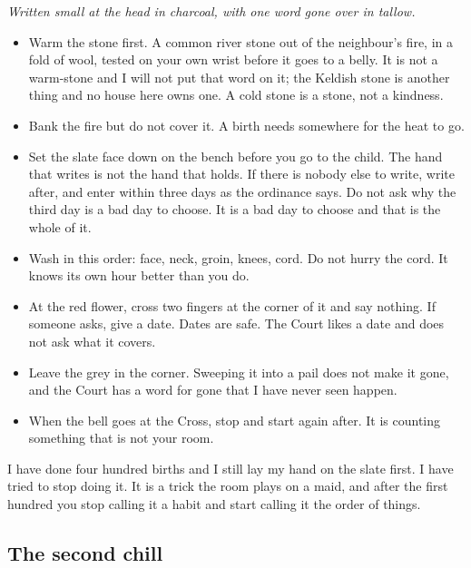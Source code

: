 \documentclass{design/chronicle}
\begin{document}
\emph{Written small at the head in charcoal, with one word gone over in tallow.}

\begin{itemize}[leftmargin=1.4em,itemsep=1pt,topsep=3pt,parsep=0pt]

\item Warm the stone first. A common river stone out of the neighbour’s fire, in a fold of wool, tested on your own wrist before it goes to a belly. It is not a warm-stone and I will not put that word on it; the Keldish stone is another thing and no house here owns one. A cold stone is a stone, not a kindness.

\item Bank the fire but do not cover it. A birth needs somewhere for the heat to go.

\item Set the slate face down on the bench before you go to the child. The hand that writes is not the hand that holds. If there is nobody else to write, write after, and enter within three days as the ordinance says. Do not ask why the third day is a bad day to choose. It is a bad day to choose and that is the whole of it.

\item Wash in this order: face, neck, groin, knees, cord. Do not hurry the cord. It knows its own hour better than you do.

\item At the red flower, cross two fingers at the corner of it and say nothing. If someone asks, give a date. Dates are safe. The Court likes a date and does not ask what it covers.

\item Leave the grey in the corner. Sweeping it into a pail does not make it gone, and the Court has a word for gone that I have never seen happen.

\item When the bell goes at the Cross, stop and start again after. It is counting something that is not your room.

\end{itemize}

I have done four hundred births and I still lay my hand on the slate first. I have tried to stop doing it. It is a trick the room plays on a maid, and after the first hundred you stop calling it a habit and start calling it the order of things.

\subsection*{The second chill}
\end{document}
